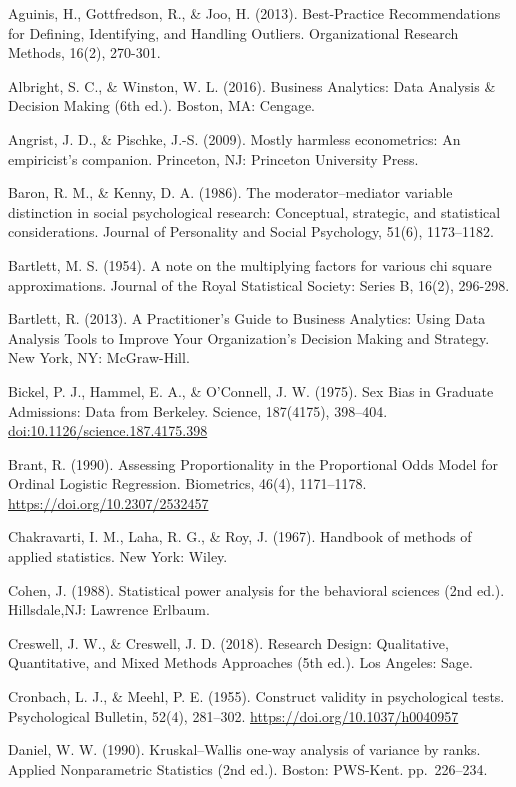 \documentclass[
]{book}
\begin{document}
Aguinis, H., Gottfredson, R., \& Joo, H. (2013). Best-Practice Recommendations for Defining, Identifying, and Handling Outliers. Organizational Research Methods, 16(2), 270-301.

Albright, S. C., \& Winston, W. L. (2016). Business Analytics: Data Analysis \& Decision Making (6th ed.). Boston, MA: Cengage.

Angrist, J. D., \& Pischke, J.-S. (2009). Mostly harmless econometrics: An empiricist's companion. Princeton, NJ: Princeton University Press.

Baron, R. M., \& Kenny, D. A. (1986). The moderator--mediator variable distinction in social psychological research: Conceptual, strategic, and statistical considerations. Journal of Personality and Social Psychology, 51(6), 1173--1182.

Bartlett, M. S. (1954). A note on the multiplying factors for various chi square approximations. Journal of the Royal Statistical Society: Series B, 16(2), 296-298.

Bartlett, R. (2013). A Practitioner's Guide to Business Analytics: Using Data Analysis Tools to Improve Your Organization's Decision Making and Strategy. New York, NY: McGraw-Hill.

Bickel, P. J., Hammel, E. A., \& O'Connell, J. W. (1975). Sex Bias in Graduate Admissions: Data from Berkeley. Science, 187(4175), 398--404. \url{doi:10.1126/science.187.4175.398}

Brant, R. (1990). Assessing Proportionality in the Proportional Odds Model for Ordinal Logistic Regression. Biometrics, 46(4), 1171--1178. \url{https://doi.org/10.2307/2532457}

Chakravarti, I. M., Laha, R. G., \& Roy, J. (1967). Handbook of methods of applied statistics. New York: Wiley.

Cohen, J. (1988). Statistical power analysis for the behavioral sciences (2nd ed.). Hillsdale,NJ: Lawrence Erlbaum.

Creswell, J. W., \& Creswell, J. D. (2018). Research Design: Qualitative, Quantitative, and Mixed Methods Approaches (5th ed.). Los Angeles: Sage.

Cronbach, L. J., \& Meehl, P. E. (1955). Construct validity in psychological tests. Psychological Bulletin, 52(4), 281--302. \url{https://doi.org/10.1037/h0040957}

Daniel, W. W. (1990). Kruskal--Wallis one-way analysis of variance by ranks. Applied Nonparametric Statistics (2nd ed.). Boston: PWS-Kent. pp.~226--234.
\end{document}
